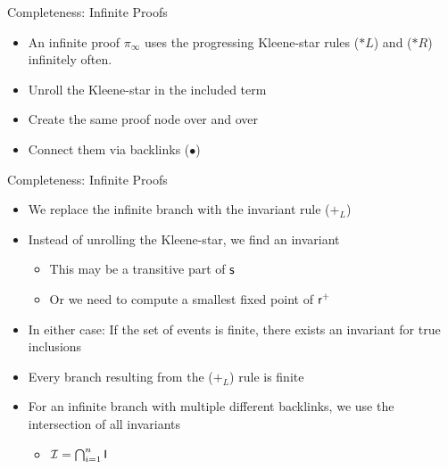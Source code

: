 \documentclass[t,english,aspectratio=169,11pt]{beamer}
\begin{document}
\begin{frame}{Completeness: Infinite Proofs}
\begin{itemize}[<+->]
	\item An infinite proof $\pi_\infty$ uses the progressing Kleene-star rules ($*L$) and ($*R$) infinitely often.
\end{itemize}
	\begin{minipage}{0.4\textwidth} %
	\begin{itemize}[<+->]
		\item Unroll the Kleene-star in the included term
		\item<4-> Create the same proof node over and over
		\item<5-> Connect them via backlinks ($\bullet$)
	\end{itemize}
	\end{minipage}\begin{minipage}{0.6\textwidth}
	\end{minipage}
\end{frame}


\begin{frame}{Completeness: Infinite Proofs}
\begin{itemize}[<+->]
	\item We replace the infinite branch with the invariant rule ($+_L$)
	\item Instead of unrolling the Kleene-star, we find an invariant
	\begin{itemize}[<.->]
		\item This may be a transitive part of $\textsf{\upshape s}$
		\item Or we need to compute a smallest fixed point of $\textsf{\upshape r}^+$
	\end{itemize}
	\item In either case: If the set of events is finite, there exists an invariant for true inclusions
	\item Every branch resulting from the ($+_L$) rule is finite
	\item For an infinite branch with multiple different backlinks, we use the intersection of all invariants
	\begin{itemize}[<.->]
		\item $\mathcal{I} = \bigcap_{i=1}^n \textsf{\upshape I}$
\end{itemize}	 
\end{itemize}
\end{frame}
\end{document}
